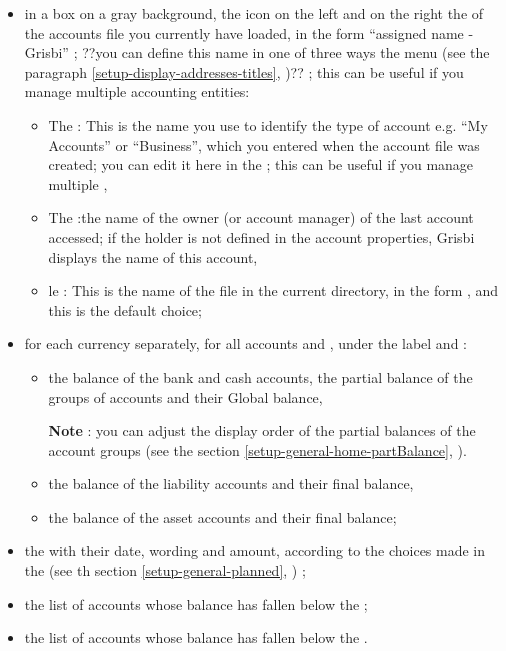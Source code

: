 \begin{itemize}
	 \item in a box on a gray background, the  icon on the left and on the right the  of the accounts file you currently have loaded, in the form   \enquote{assigned name - Grisbi} ; ??you can define this name in one of three ways the  menu (see the paragraph \vref{setup-display-addresses-titles}, )?? ; this can be useful if you manage multiple accounting entities:

		\begin{itemize}
			 \item The  : This is the name you use to identify the type of account e.g.  \enquote{My Accounts} or  \enquote{Business}, which you entered when the account file was created; you can edit it here in the    ; this can be useful if you manage multiple  , 
			 \item The  :the name of the owner (or  account manager) of the last account accessed; if the holder is not defined in the account properties, Grisbi displays the name of this account,
			 \item le  :  This is the name of the file in the current directory, in the form  , and this is the default choice;
		\end{itemize}
		
	 \item for each currency separately, for all accounts and ,  under the label  and  :
		\begin{itemize}
			 \item the balance of the bank and cash accounts, the partial balance of the groups of accounts and their Global balance,

			 \textbf{Note} : you can adjust the display order of the partial balances of the account groups (see the section \vref{setup-general-home-partBalance}, ).			 
			 \item the balance of the liability accounts and their final balance,
			 \item the balance of the asset accounts and their final balance;
		\end{itemize}
	\item the  with their date, wording and amount, according to the choices made in the  (see th section \vref{setup-general-planned}, ) ;
	\item the list of accounts whose balance has fallen below the   ;
	\item the list of accounts whose balance has fallen below the  .
\end{itemize}


